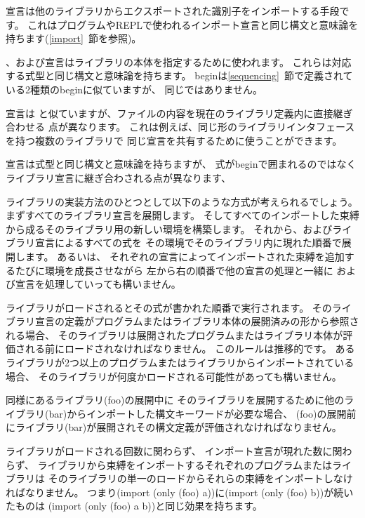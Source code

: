 宣言は他のライブラリからエクスポートされた識別子をインポートする手段です。
これはプログラムやREPLで使われるインポート宣言と同じ構文と意味論を持ちます(\ref{import}~節を参照)。

、および宣言はライブラリの本体を指定するために使われます。
これらは対応する式型と同じ構文と意味論を持ちます。
{\cf begin}は\ref{sequencing}~節で定義されている2種類の{\cf begin}に似ていますが、
同じではありません。

宣言は
と似ていますが、ファイルの内容を現在のライブラリ定義内に直接継ぎ合わせる
点が異なります。
これは例えば、同じ形のライブラリインタフェースを持つ複数のライブラリで
同じ宣言を共有するために使うことができます。

宣言は式型と同じ構文と意味論を持ちますが、
式が{\cf begin}で囲まれるのではなくライブラリ宣言に継ぎ合わされる点が異なります、


ライブラリの実装方法のひとつとして以下のような方式が考えられるでしょう。
まずすべてのライブラリ宣言を展開します。
そしてすべてのインポートした束縛から成るそのライブラリ用の新しい環境を構築します。
それから、およびライブラリ宣言によるすべての式を
その環境でそのライブラリ内に現れた順番で展開します。
あるいは、
それぞれの宣言によってインポートされた束縛を追加するたびに環境を成長させながら
左から右の順番で他の宣言の処理と一緒に
および宣言を処理していっても構いません。

ライブラリがロードされるとその式が書かれた順番で実行されます。
そのライブラリ宣言の定義がプログラムまたはライブラリ本体の展開済みの形から参照される場合、
そのライブラリは展開されたプログラムまたはライブラリ本体が評価される前にロードされなければなりません。
このルールは推移的です。
あるライブラリが2つ以上のプログラムまたはライブラリからインポートされている場合、
そのライブラリが何度かロードされる可能性があっても構いません。

同様にあるライブラリ{\cf (foo)}の展開中に
そのライブラリを展開するために他のライブラリ{\cf (bar)}からインポートした構文キーワードが必要な場合、
{\cf (foo)}の展開前にライブラリ{\cf (bar)}が展開されその構文定義が評価されなければなりません。

ライブラリがロードされる回数に関わらず、
インポート宣言が現れた数に関わらず、
ライブラリから束縛をインポートするそれぞれのプログラムまたはライブラリは
そのライブラリの単一のロードからそれらの束縛をインポートしなければなりません。
つまり{\cf (import (only (foo) a))}に{\cf (import (only (foo) b))}が続いたものは
{\cf (import (only (foo) a b))}と同じ効果を持ちます。


